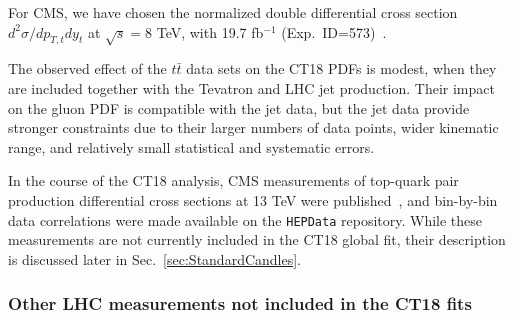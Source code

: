 For CMS, we
have chosen the normalized double differential cross section $d^2 \sigma/dp_{T,t}dy_t$  at $\sqrt{s}=8$ TeV, with 19.7 fb$^{-1}$ (Exp.~ID=573)~\cite{Sirunyan:2017azo}. 

The observed effect of the $t\bar t$ data sets on the CT18 PDFs is modest, when they are included together with the Tevatron and LHC jet production. 
Their impact on the gluon PDF is compatible with the jet data, but the jet data provide stronger constraints due to their larger numbers of data points, wider kinematic range, and relatively small statistical and systematic errors.

In the course of the CT18 analysis, CMS measurements of top-quark pair production differential cross sections at 13 TeV were published~\cite{Sirunyan:2018ucr}, 
and bin-by-bin data correlations were made available on the \texttt{HEPData} repository.
While these measurements are not currently included in the CT18 global fit, their description is discussed later in Sec.~\ref{sec:StandardCandles}.
 
\subsubsection{Other LHC measurements not included in the CT18 fits
\label{sec:DataOther}
}

